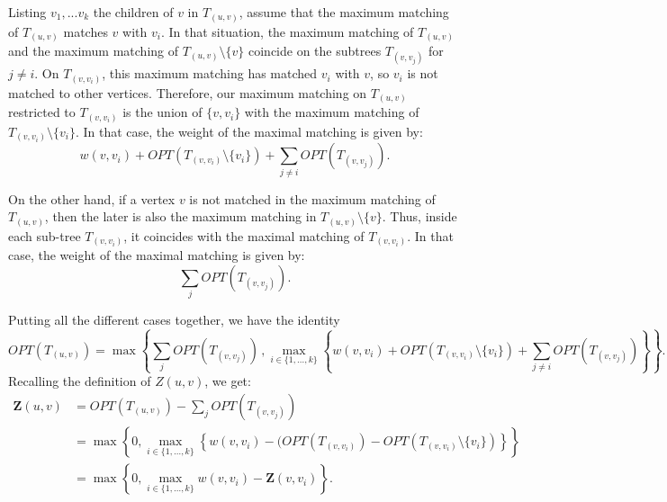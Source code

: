 \documentclass[11pt]{article}
\begin{document}
Listing $v_1,...v_k$ the children of $v$ in $T_{(u,v)}$, assume that the maximum matching of $T_{(u,v)}$ matches $v$ with $v_i$. 
In that situation, the maximum matching of $T_{(u,v)}$ and the maximum matching of $T_{(u,v)} \setminus \{v\}$ coincide on the subtrees $T_{(v,v_j)}$ for $j \neq i$.
On $T_{(v,v_i)}$, this maximum matching has matched $v_i$ with $v$, so $v_i$ is not matched to other vertices. Therefore, our maximum matching on $T_{(u,v)}$ restricted to $T_{(v,v_i)}$ is the union of $\{v,v_i\}$ with the maximum matching of
$T_{(v,v_i)} \setminus \{v_i\}$. In that case, the weight of the maximal matching is given by:
\[
w(v,v_i) + OPT(T_{(v,v_i)} \setminus \{v_i\}) + \sum_{j \neq i} OPT(T_{(v,v_j)}).
\]

On the other hand, if a vertex $v$ is not matched in the maximum matching of $T_{(u,v)}$, then the later is also the maximum matching in $T_{(u,v)} \setminus \{v\}$. Thus, inside each sub-tree $T_{(v,v_i)}$, it coincides with the maximal matching of $T_{(v,v_i)}$.
In that case, the weight of the maximal matching is given by:
\[ \sum_{j} OPT(T_{(v,v_j)}).  \]

Putting all the different cases together, we have the identity
\[
OPT(T_{(u,v)}) = \max \left\{ \sum_{j} OPT(T_{(v,v_j)}) \, , \max_{i\in \{ 1, \ldots , k \} } \left\{ w(v,v_i) + OPT(T_{(v,v_i)} \setminus \{v_i\}) + \sum_{j \neq i} OPT(T_{(v,v_j)}) \right\} \right\}.
\]
Recalling the definition of $Z(u,v)$, we get:
\begin{align*}
\mathbf{Z}(u,v)&= 
OPT(T_{(u,v)})
-\sum_{j} OPT(T_{(v,v_j)}) \\
&= \max\left\{0, \max_{i\in \{ 1, \ldots , k \} } \left\{w(v,v_i)-(OPT(T_{(v,v_i)})-OPT(T_{(v,v_i)} \setminus \{v_i\}) \right\} \right\} \\
&= \max\left\{0,\max_{i\in \{ 1, \ldots , k \} } w(v,v_i)-\mathbf{Z}(v,v_i)\right\}.
\end{align*}
\end{document}
